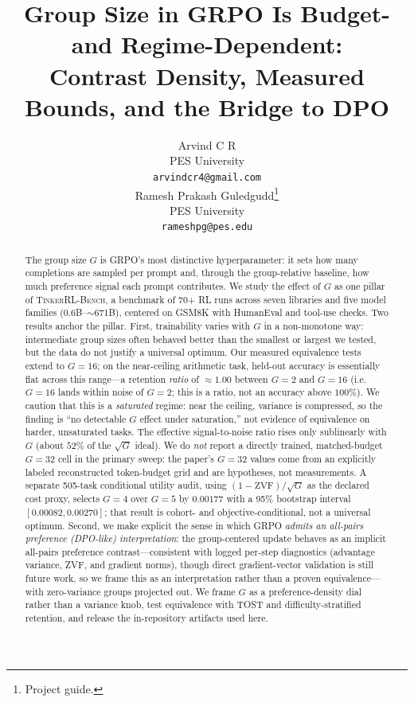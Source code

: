 \documentclass{article}
\title{Group Size in GRPO Is Budget- and Regime-Dependent:\\
       Contrast Density, Measured Bounds, and the Bridge to DPO}
\author{
  Arvind C R \\
  PES University\\
  \texttt{arvindcr4@gmail.com} \\
  \And
  Ramesh Prakash Guledgudd\thanks{Project guide.} \\
  PES University\\
  \texttt{rameshpg@pes.edu} \\
}
\newcommand{\ours}{\textsc{TinkerRL-Bench}}
\begin{document}
\sloppy {}  \hfuzz=2pt
\maketitle
\begin{abstract}
The group size $G$ is GRPO's most distinctive hyperparameter: it sets how many
completions are sampled per prompt and, through the group-relative baseline, how
much preference signal each prompt contributes. We study the effect of $G$ as one
pillar of \ours{}, a benchmark of 70+ RL runs across seven libraries and
five model families ($0.6$B--$\sim$671B), centered on GSM8K with HumanEval and
tool-use checks. Two results
anchor the pillar. First, trainability varies with $G$ in a non-monotone way:
intermediate group sizes often behaved better than the smallest or largest we
tested, but the data do not justify a universal optimum. Our measured equivalence
tests extend to $G{=}16$; on the near-ceiling arithmetic task, held-out accuracy
is essentially flat across this range---a retention \emph{ratio} of ${\approx}1.00$
between $G{=}2$ and $G{=}16$ (i.e.\ $G{=}16$ lands within noise of $G{=}2$; this is
a ratio, not an accuracy above $100\%$). We caution that this is a \emph{saturated}
regime: near the ceiling, variance is compressed, so the finding is ``no detectable
$G$ effect under saturation,'' not evidence of equivalence on harder, unsaturated
tasks. The effective signal-to-noise ratio
rises only sublinearly with $G$ (about $52\%$ of the $\sqrt{G}$ ideal). We do
\emph{not} report a directly trained, matched-budget $G{=}32$ cell in the
primary sweep: the paper's $G{=}32$ values come from an explicitly labeled
reconstructed token-budget grid and are hypotheses, not measurements. A separate
505-task conditional utility audit, using $(1-\mathrm{ZVF})/\sqrt{G}$ as the
declared cost proxy, selects $G{=}4$ over $G{=}5$ by $0.00177$ with a 95\%
bootstrap interval $[0.00082,0.00270]$; that result is cohort- and
objective-conditional, not a universal optimum. Second, we make explicit the sense in which GRPO
\emph{admits an all-pairs preference (DPO-like) interpretation}: the group-centered
update behaves as an implicit all-pairs preference
contrast---consistent with logged per-step diagnostics (advantage variance,
ZVF, and gradient norms), though direct gradient-vector validation is still future
work, so we frame this as an interpretation rather than a proven equivalence---with zero-variance groups
projected out. We frame $G$ as a preference-density dial rather than a variance
knob, test equivalence with TOST and difficulty-stratified retention, and release
the in-repository artifacts used here.
\end{abstract}
 
\end{document}

